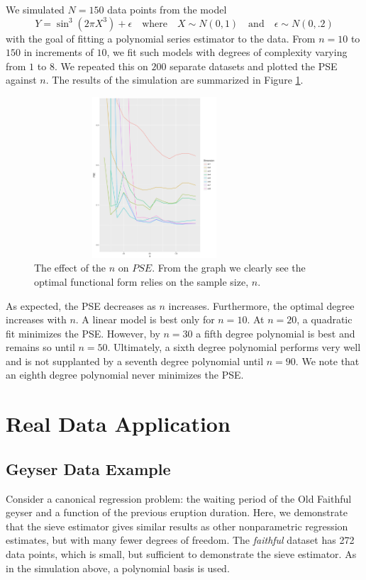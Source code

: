 \documentclass[12pt]{article}  %
\begin{document}
We simulated $N = 150$ data points from the model
$$Y = \sin^3(2\pi X^3) + \epsilon\hspace{1em}\text{where}\hspace{1em}X \sim N(0,1)\hspace{1em}\text{and}\hspace{1em}
\epsilon \sim N(0, .2)$$
with the goal of fitting a polynomial series estimator to the data. From $n = 10$ to $150$ in increments of $10$, we fit such models with degrees of complexity varying from $1$ to $8$. We repeated this on $200$ separate datasets and plotted the PSE against $n$. The results of the simulation are summarized in Figure \ref{fig:sim}. 
\begin{figure}[h]
    \centering
    \includegraphics[width=0.8\textwidth, height= 6cm]{sim_plot.pdf}  
    \caption{The effect of the $n$ on $PSE$. From the graph we clearly see the optimal functional form relies on the sample size, $n$.}
    \label{fig:sim}{}
\end{figure}
 As expected, the PSE decreases as $n$ increases. Furthermore, the optimal degree increases with $n$. A linear model is best only for $n=10$. At $n=20$, a quadratic fit minimizes the PSE. However, by $n=30$ a fifth degree polynomial is best and remains so until $n=50$. Ultimately, a sixth degree polynomial performs very well and is not supplanted by a seventh degree polynomial until $n=90$. We note that an eighth degree polynomial never minimizes the PSE.


\section{Real Data Application}
\subsection{Geyser Data Example}

Consider a canonical regression problem: the waiting period of the Old Faithful geyser and a function  of the previous eruption duration.  Here, we demonstrate that the sieve estimator gives similar results as other nonparametric regression estimates, but with many fewer degrees of freedom. The \textit{faithful} dataset has 272 data points, which is small, but sufficient to demonstrate the sieve estimator. As in the simulation above, a polynomial basis is used.
\end{document}
